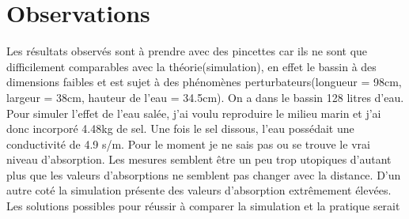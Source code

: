 \documentclass{article}
\begin{document}
\section{Observations}

Les résultats observés sont à prendre avec des pincettes car ils ne sont que difficilement comparables avec la théorie(simulation), en effet le bassin à des dimensions faibles et est sujet à des phénomènes perturbateurs(longueur = 98cm, largeur = 38cm, hauteur de l'eau = 34.5cm). On a dans le bassin 128 litres d'eau. Pour simuler l'effet de l'eau salée, j'ai voulu reproduire le milieu marin et j'ai donc incorporé 4.48kg de sel. Une fois le sel dissous, l'eau possédait une conductivité de 4.9 s/m.
Pour le moment je ne sais pas ou se trouve le vrai niveau d'absorption. Les mesures semblent être un peu trop utopiques d'autant plus que les valeurs d'absorptions ne semblent pas changer avec la distance. D'un autre coté la simulation présente des valeurs d'absorption extrêmement élevées.\\
Les solutions possibles pour réussir à comparer la simulation et la pratique serait 
\end{document}
